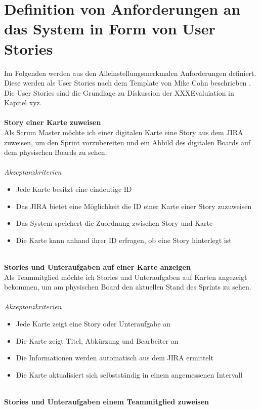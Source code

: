 \documentclass[12pt,titlepage]{scrartcl}
\begin{document}
	\section{Definition von Anforderungen an das System in Form von User Stories}
	Im Folgenden werden aus den Alleinstellungsmerkmalen Anforderungen definiert. Diese werden als User Stories nach dem Template von Mike Cohn beschrieben \cite{template}. Die User Stories sind die Grundlage zu Diskussion der XXXEvaluiation in Kapitel xyz. \\ \\
	\textbf{Story einer Karte zuweisen} \\
	Als Scrum Master möchte ich einer digitalen Karte eine Story aus dem JIRA zuweisen, um den Sprint vorzubereiten und ein Abbild des digitalen Boards auf dem physischen Boards zu sehen. \\ \\
	\textit{Akzeptanzkriterien}
	\begin{itemize}
		\setlength\itemsep{0em}
		\item Jede Karte besitzt eine eindeutige ID
		\item Das JIRA bietet eine Möglichkeit die ID einer Karte einer Story zuzuweisen
		\item Das System speichert die Zuordnung zwischen Story und Karte
		\item Die Karte kann anhand ihrer ID erfragen, ob eine Story hinterlegt ist
	\end{itemize}
	\noindent
	\\ \textbf{Stories und Unteraufgaben auf einer Karte anzeigen} \\
	Als Teammitglied möchte ich Stories und Unteraufgaben auf Karten angezeigt bekommen, um am physischen Board den aktuellen Stand des Sprints zu sehen. \\ \\
	\textit{Akzeptanzkriterien}
	\begin{itemize}
		\setlength\itemsep{0em}
		\item Jede Karte zeigt eine Story oder Unteraufgabe an
		\item Die Karte zeigt Titel, Abkürzung und Bearbeiter an
		\item Die Informationen werden automatisch aus dem JIRA ermittelt
		\item Die Karte aktualisiert sich selbstständig in einem angemessenen Intervall
	\end{itemize}
	\noindent
	\\ \textbf{Stories und Unteraufgaben einem Teammitglied zuweisen} \\
\end{document}
